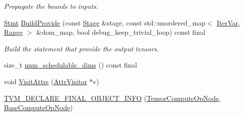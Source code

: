 \begin{DoxyCompactItemize}
\begin{DoxyCompactList}\small\item\em Propagate the bounds to inputs. \end{DoxyCompactList}\item 
\hyperlink{classtvm_1_1tir_1_1Stmt}{Stmt} \hyperlink{classtvm_1_1te_1_1TensorComputeOpNode_a003be01f4aded57625d0c347b0f6ac73}{Build\+Provide} (const \hyperlink{classtvm_1_1te_1_1Stage}{Stage} \&stage, const std\+::unordered\+\_\+map$<$ \hyperlink{classtvm_1_1tir_1_1IterVar}{Iter\+Var}, \hyperlink{classtvm_1_1Range}{Range} $>$ \&dom\+\_\+map, bool debug\+\_\+keep\+\_\+trivial\+\_\+loop) const final
\begin{DoxyCompactList}\small\item\em Build the statement that provide the output tensors. \end{DoxyCompactList}\item 
size\+\_\+t \hyperlink{classtvm_1_1te_1_1TensorComputeOpNode_a028a9ae8d9d27abd972b85248c9e3160}{num\+\_\+schedulable\+\_\+dims} () const final
\item 
void \hyperlink{classtvm_1_1te_1_1TensorComputeOpNode_a55712c541cbbbeda5f8ea994a3eed680}{Visit\+Attrs} (\hyperlink{classtvm_1_1AttrVisitor}{Attr\+Visitor} $\ast$v)
\item 
\hyperlink{classtvm_1_1te_1_1TensorComputeOpNode_a7f18d3b3c0c0f06b1cfddecf580e9276}{T\+V\+M\+\_\+\+D\+E\+C\+L\+A\+R\+E\+\_\+\+F\+I\+N\+A\+L\+\_\+\+O\+B\+J\+E\+C\+T\+\_\+\+I\+N\+FO} (\hyperlink{classtvm_1_1te_1_1TensorComputeOpNode}{Tensor\+Compute\+Op\+Node}, \hyperlink{classtvm_1_1te_1_1BaseComputeOpNode}{Base\+Compute\+Op\+Node})
\end{DoxyCompactItemize}

